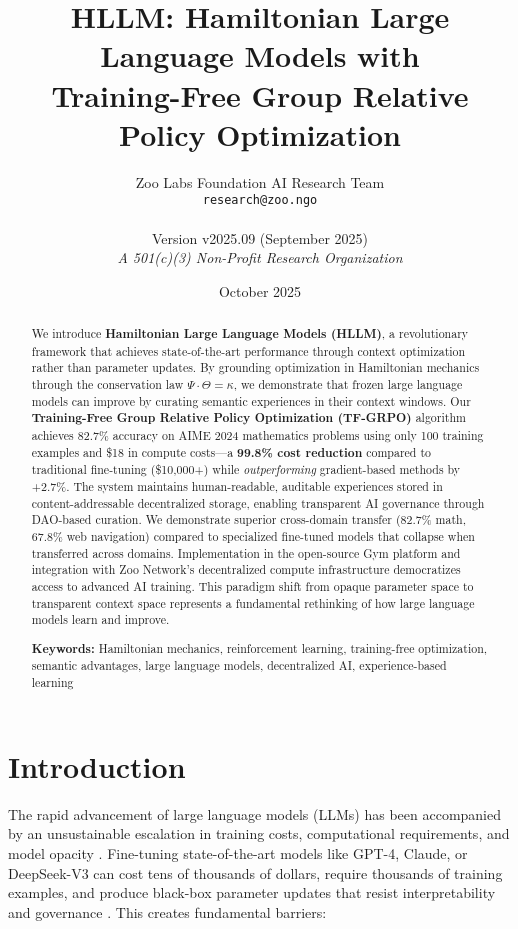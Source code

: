 \documentclass[11pt,a4paper]{article}
\title{\textbf{HLLM: Hamiltonian Large Language Models with \\ Training-Free Group Relative Policy Optimization}}
\author{
Zoo Labs Foundation AI Research Team \\
\texttt{research@zoo.ngo} \\
\\
\small Version v2025.09 (September 2025) \\
\small \textit{A 501(c)(3) Non-Profit Research Organization}
}
\date{October 2025}
\begin{document}
\maketitle

\begin{abstract}
We introduce \textbf{Hamiltonian Large Language Models (HLLM)}, a revolutionary framework that achieves state-of-the-art performance through context optimization rather than parameter updates. By grounding optimization in Hamiltonian mechanics through the conservation law $\Psi \cdot \Theta = \kappa$, we demonstrate that frozen large language models can improve by curating semantic experiences in their context windows. Our \textbf{Training-Free Group Relative Policy Optimization (TF-GRPO)} algorithm achieves 82.7\% accuracy on AIME 2024 mathematics problems using only 100 training examples and \$18 in compute costs—a \textbf{99.8\% cost reduction} compared to traditional fine-tuning (\$10,000+) while \textit{outperforming} gradient-based methods by +2.7\%. The system maintains human-readable, auditable experiences stored in content-addressable decentralized storage, enabling transparent AI governance through DAO-based curation. We demonstrate superior cross-domain transfer (82.7\% math, 67.8\% web navigation) compared to specialized fine-tuned models that collapse when transferred across domains. Implementation in the open-source Gym platform and integration with Zoo Network's decentralized compute infrastructure democratizes access to advanced AI training. This paradigm shift from opaque parameter space to transparent context space represents a fundamental rethinking of how large language models learn and improve.

\textbf{Keywords:} Hamiltonian mechanics, reinforcement learning, training-free optimization, semantic advantages, large language models, decentralized AI, experience-based learning
\end{abstract}

\section{Introduction}

The rapid advancement of large language models (LLMs) has been accompanied by an unsustainable escalation in training costs, computational requirements, and model opacity \cite{kaplan2020scaling,hoffmann2022training}. Fine-tuning state-of-the-art models like GPT-4, Claude, or DeepSeek-V3 can cost tens of thousands of dollars, require thousands of training examples, and produce black-box parameter updates that resist interpretability and governance \cite{ouyang2022training}. This creates fundamental barriers:
\end{document}
